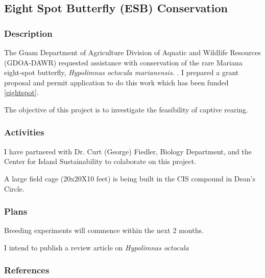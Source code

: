 \begin{comment}

\raggedright\vspace{2mm}\textbf{Activity}
\begin{itemize}
\item Worked with Ben DeLoso, Tom Marler's grad student, to perform a CAS
parasitoid survey \cite{deloso2018parasitoid}. 
\end{itemize}
\raggedright\vspace{2mm}\textbf{Reference(s)}

\begin{btSect}[vancouver]{zotero}
\btPrintCited
\end{btSect}
\newpage{}
\end{btUnit}

\begin{btUnit}

\end{comment}


\subsection{Eight Spot Butterfly (ESB) Conservation}
\begin{refsection}

\subsubsection{Description}

The Guam Department of Agriculture Division of Aquatic and Wildlife
Resources (GDOA-DAWR) requested assistance with conservation of the
rare Mariana eight-spot butterfly, \emph{Hypolimnas octocula marianensis.
}. I prepared a grant proposal and permit application to do this work \cite{aubrey_moore_application_2016} which has been funded \ref{eightspot}.

The objective of this project is to investigate the feasibility of captive rearing.

\subsubsection{Activities}

I have partnered with Dr. Curt (George) Fiedler, Biology Department, and the Center for Island Sustainability to colaborate on this project.

A large field cage (20x20X10 feet) is being built in the CIS compound in Dean's Circle.

\subsubsection{Plans}

Breeding experiments will commence within the next 2 months.

I intend to publish a review article on \textit{Hypolimnas octocula} \cite{moore_mariana_2013}

\subsubsection{References}
\printbibliography[heading=none]
\end{refsection}


